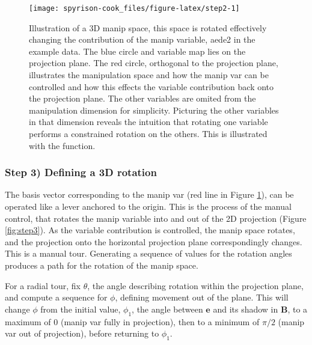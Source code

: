 \begin{Schunk}
\begin{figure}

{\centering \texttt{[image: spyrison-cook\_files/figure-latex/step2-1]} 

}

\caption[Illustration of a 3D manip space, this space is rotated effectively changing the contribution of the manip variable, aede2 in the example data]{Illustration of a 3D manip space, this space is rotated effectively changing the contribution of the manip variable, aede2 in the example data. The blue circle and variable map lies on the projection plane. The red circle, orthogonal to the projection plane, illustrates the manipulation space and how the manip var can be controlled and how this effects the variable contribution back onto the projection plane. The other variables are omited from the manipulation dimension for simplicity. Picturing the other variables in that dimension reveals the intuition that rotating one variable performs a constrained rotation on the others. This is illustrated with the  function.}\label{fig:step2}
\end{figure}
\end{Schunk}

\hypertarget{step-3-defining-a-3d-rotation}{%
\subsubsection{Step 3) Defining a 3D
rotation}\label{step-3-defining-a-3d-rotation}}

The basis vector corresponding to the manip var (red line in Figure
\ref{fig:step2}), can be operated like a lever anchored to the origin.
This is the process of the manual control, that rotates the manip
variable into and out of the 2D projection (Figure \ref{fig:step3}). As
the variable contribution is controlled, the manip space rotates, and
the projection onto the horizontal projection plane correspondingly
changes. This is a manual tour. Generating a sequence of values for the
rotation angles produces a path for the rotation of the manip space.

For a radial tour, fix \(\theta\), the angle describing rotation within
the projection plane, and compute a sequence for \(\phi\), defining
movement out of the plane. This will change \(\phi\) from the initial
value, \(\phi_1\), the angle between \(\textbf{e}\) and its shadow in
\(\textbf{B}\), to a maximum of \(0\) (manip var fully in projection),
then to a minimum of \(\pi/2\) (manip var out of projection), before
returning to \(\phi_1\).

